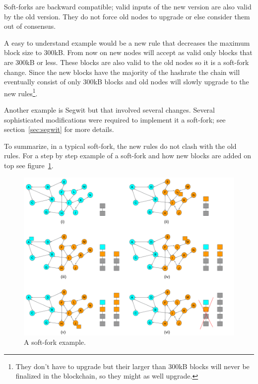 Soft-forks are backward compatible; valid inputs of the new version are also valid by the old version. They do not force old nodes to upgrade or else consider them out of consensus.

A easy to understand example would be a new rule that decreases the maximum block size to 300kB. From now on new nodes will accept as valid only blocks that are 300kB or less. These blocks are also valid to the old nodes so it is a soft-fork change. Since the new blocks have the majority of the hashrate the chain will eventually consist of only 300kB blocks and old nodes will slowly upgrade to the new rules\footnote{They don't have to upgrade but their larger than 300kB blocks will never be finalized in the blockchain, so they might as well upgrade.}.

Another example is Segwit but that involved several changes. Several sophisticated modifications were required to implement it a soft-fork; see section~\ref{sec:segwit} for more details.

To summarize, in a typical soft-fork, the new rules do not clash with the old rules.
For a step by step example of a soft-fork and how new blocks are added on top see figure~\ref{fig:soft-fork-example}.

\begin{figure}[h]
\begin{center}
\includegraphics[scale=0.4]{images/soft-fork-example}
\caption{A soft-fork example.}
\label{fig:soft-fork-example}
\end{center}
\end{figure}

